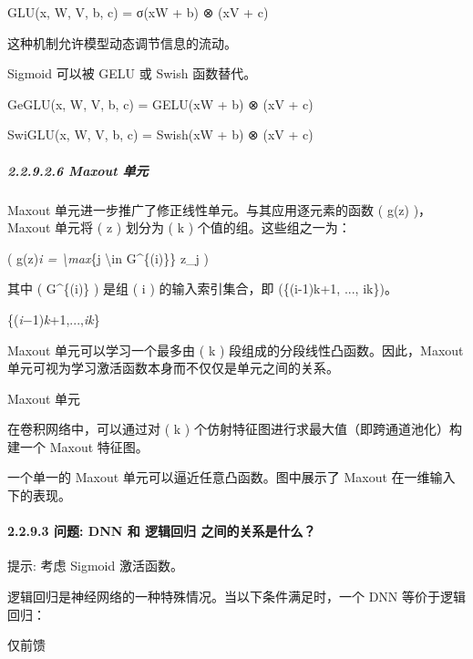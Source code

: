GLU(x, W, V, b, c) = σ(xW + b) ⊗ (xV + c)

这种机制允许模型动态调节信息的流动。

Sigmoid 可以被 GELU 或 Swish 函数替代。

GeGLU(x, W, V, b, c) = GELU(xW + b) ⊗ (xV + c)

SwiGLU(x, W, V, b, c) = Swish(xW + b) ⊗ (xV + c)

\subparagraph{\texorpdfstring{\textbf{2.2.9.2.6} \textbf{Maxout
单元}}{2.2.9.2.6 Maxout 单元}}\label{22926-maxout-ux5355ux5143}

Maxout 单元进一步推广了修正线性单元。与其应用逐元素的函数 ( g(z)
)，Maxout 单元将 ( z ) 划分为 ( k ) 个值的组。这些组之一为：

( g(z)\emph{i = \textbackslash max}\{j \textbackslash in G\^{}\{(i)\}\}
z\_j )


其中 ( G\^{}\{(i)\} ) 是组 ( i ) 的输入索引集合，即 (\{(i-1)k+1, ...,
ik\})。

\{(\emph{i}−1)\emph{k}+1,...,\emph{ik}\}

Maxout 单元可以学习一个最多由 ( k ) 段组成的分段线性凸函数。因此，Maxout
单元可视为学习激活函数本身而不仅仅是单元之间的关系。

Maxout 单元

在卷积网络中，可以通过对 ( k )
个仿射特征图进行求最大值（即跨通道池化）构建一个 Maxout 特征图。

一个单一的 Maxout 单元可以逼近任意凸函数。图中展示了 Maxout
在一维输入下的表现。


\paragraph{\texorpdfstring{\textbf{2.2.9.3 问题: DNN 和 逻辑回归
之间的关系是什么？}}{2.2.9.3 问题: DNN 和 逻辑回归 之间的关系是什么？}}\label{2293-ux95eeux9898-dnn-ux548c-ux903bux8f91ux56deux5f52-ux4e4bux95f4ux7684ux5173ux7cfbux662fux4ec0ux4e48}

提示: 考虑 Sigmoid 激活函数。

逻辑回归是神经网络的一种特殊情况。当以下条件满足时，一个 DNN
等价于逻辑回归：

仅前馈

